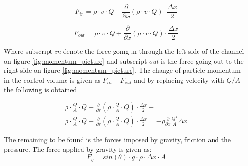 \begin{equation}
	F_{in}= \rho \cdot v \cdot Q - \frac{\partial}{\partial x}(\rho \cdot v \cdot Q) \cdot \frac{\Delta x}{2}
\end{equation}

\begin{equation}
	F_{out} = \rho \cdot v \cdot Q + \frac{\partial}{\partial x}(\rho \cdot v \cdot Q) \cdot \frac{\Delta x}{2}
\end{equation}

Where subscript \textit{in} denote the force going in through the left side of the channel on figure \ref{fig:momentum_picture} and subscript \textit{out} is the force going out to the right side on figure \ref{fig:momentum_picture}.
The change of particle momentum in the control volume is given as $F_{in}- F_{out}$ and by replacing velocity with $Q/A$ the following is obtained

\begin{equation}\label{mass_flow_speed}
\begin{array}{l}
\rho \cdot \frac{Q}{A} \cdot Q - \frac{\partial}{\partial x}\left(\rho \cdot \frac{Q}{A}  \cdot Q\right) \cdot \frac{\Delta x}{2} -\\ 
\rho \cdot \frac{Q}{A}  \cdot Q + \frac{\partial}{\partial x}\left(\rho \cdot \frac{Q}{A}  \cdot Q\right) \cdot \frac{\Delta x}{2} 
= -  \rho\frac{\partial}{\partial x} \frac{Q^2}{A}\Delta x
\end{array}
\end{equation}

The remaining to be found is the forces imposed by gravity, friction and the pressure.
The force applied by gravity is given as:
\begin{equation}
F_g = sin(\theta)\cdot g \cdot \rho \cdot \Delta x \cdot A
\label{gravity_force} 
\end{equation}

